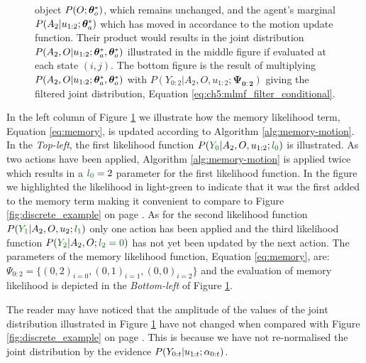 \begin{figure}
{ object $P(O;\boldsymbol{\theta}^*_o)$, which remains unchanged, and the agent's marginal $P(A_2|u_{1:2};\boldsymbol{\theta}^*_a)$ which has moved in accordance to the motion update function. 
 Their product would results in the joint distribution $P(A_2,O|u_{1:2};\boldsymbol{\theta}^*_a,\boldsymbol{\theta}^*_o)$ illustrated in the middle figure if evaluated at each state $(i,j)$. The bottom figure is the result
 of multiplying $P(A_2,O|u_{1:2};\boldsymbol{\theta}^*_a,\boldsymbol{\theta}^*_o)$ with  $P(Y_{0:2}|A_2,O,u_{1:2};\boldsymbol{\Psi_{0:2}})$ giving the filtered joint distribution, Equation \ref{eq:ch5:mlmf_filter_conditional}.
 }
 \label{fig:maringal_joint_example_v2}
\end{figure}
 
In the left column of Figure \ref{fig:maringal_joint_example_v2} we illustrate how the memory likelihood term, Equation \ref{eq:memory}, 
is updated according to Algorithm \ref{alg:memory-motion}. In the \textit{Top-left}, the first likelihood function 
$P(\mathcolor{dark-green}{Y_0}|A_2,O,u_{1:2};\mathcolor{dark-green}{l_0})$ is illustrated. As two actions have been applied, Algorithm \ref{alg:memory-motion} is applied 
twice which results in a $\mathcolor{dark-green}{l_0}=2$ parameter for the first likelihood function. In the figure we highlighted the likelihood in light-green 
to indicate that it was the first added to the memory term making it convenient to compare to Figure \ref{fig:discrete_example} on page \pageref{fig:discrete_example}. As for the second 
likelihood function $P(\mathcolor{dark-green}{Y_1}|A_2,O,u_{2};\mathcolor{dark-green}{l_1})$ only one action has been applied and the third likelihood 
function $P(\mathcolor{dark-green}{Y_2}|A_2,O;\mathcolor{dark-green}{l_2=0})$ has not yet been updated by the next action. 
The parameters of the memory likelihood function, Equation \ref{eq:memory}, are: $\Psi_{0:2} = \{(0,2)_{i=0},(0,1)_{i=1},(0,0)_{i=2}\}$ and the evaluation of memory 
likelihood is depicted in the \textit{Bottom-left} of Figure \ref{fig:maringal_joint_example_v2}. 
  
The reader may have noticed that the amplitude of the values of the joint distribution illustrated in Figure \ref{fig:maringal_joint_example_v2} have not changed
when compared with Figure \ref{fig:discrete_example} on page \pageref{fig:discrete_example}. This is because we have not re-normalised the joint distribution by the evidence $P(Y_{0:t}|u_{1:t};\alpha_{0:t})$. 


